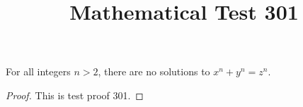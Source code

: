 \documentclass{amsart}
\begin{document}
\title{Mathematical Test 301}
\begin{theorem}
For all integers $n > 2$, there are no solutions to $x^n + y^n = z^n$.
\end{theorem}
\begin{proof}
This is test proof 301.
\end{proof}
\end{document}
